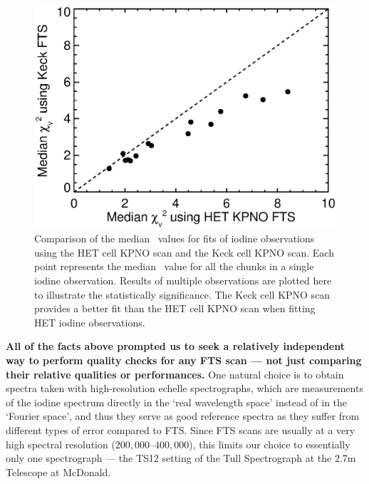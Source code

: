\begin{figure}[!th]
\includegraphics[angle=0.,scale=0.38]{het/chisq_comparison.eps}
\caption{Comparison of the median \chisq\ values for fits of iodine
  observations using the HET cell KPNO scan and the Keck cell KPNO
  scan. Each point represents the median \chisq\ value for all the
  chunks in a single iodine observation. Results of multiple
  observations are plotted here to illustrate the statistically
  significance. The Keck cell KPNO scan provides a better fit than the
  HET cell KPNO scan when fitting HET iodine observations.
  \label{fig:chisq_old_keck}}
\end{figure}

\textbf{All of the facts above prompted us to seek a relatively
  independent way to perform quality checks for any FTS scan --- not
  just comparing their relative qualities or performances.} One
natural choice is to obtain spectra taken with high-resolution echelle
spectrographs, which are measurements of the iodine spectrum directly
in the `real wavelength space' instead of in the `Fourier space', and
thus they serve as good reference spectra as they suffer from
different types of error compared to FTS. Since FTS scans are usually
at a very high spectral resolution ($200,000$--$400,000$), this limits
our choice to essentially only one spectrograph --- the TS12 setting
of the Tull Spectrograph at the 2.7m Telescope at McDonald.

